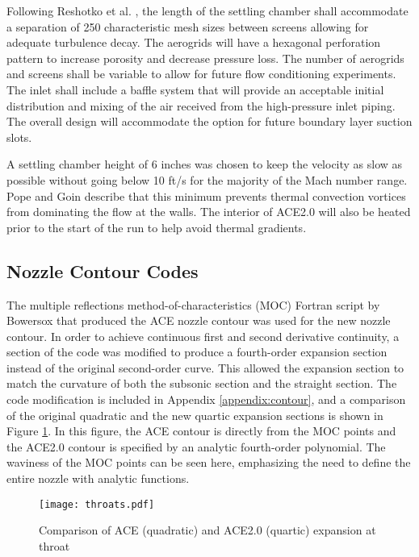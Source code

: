 Following Reshotko et al. \cite{reshotko}, the length of the settling chamber shall accommodate a separation of 250 characteristic mesh sizes between screens allowing for adequate turbulence decay. The aerogrids will have a hexagonal perforation pattern to increase porosity and decrease pressure loss. The number of aerogrids and screens shall be variable to allow for future flow conditioning experiments. The inlet shall include a baffle system that will provide an acceptable initial distribution and mixing of the air received from the high-pressure inlet piping. The overall design will accommodate the option for future boundary layer suction slots.

A settling chamber height of 6 inches was chosen to keep the velocity as slow as possible without going below 10 ft/s for the majority of the Mach number range. Pope and Goin \cite{pope} describe that this minimum prevents thermal convection vortices from dominating the flow at the walls. The interior of ACE2.0 will also be heated prior to the start of the run to help avoid thermal gradients. 

\subsection{Nozzle Contour Codes}

The multiple reflections method-of-characteristics (MOC) Fortran script by Bowersox that produced the ACE nozzle contour was used for the new nozzle contour. In order to achieve continuous first and second derivative continuity, a section of the code was modified to produce a fourth-order expansion section instead of the original second-order curve. This allowed the expansion section to match the curvature of both the subsonic section and the straight section. The code modification is included in Appendix \ref{appendix:contour}, and a comparison of the original quadratic and the new quartic expansion sections is shown in Figure \ref{fig:throats}. In this figure, the ACE contour is directly from the MOC points and the ACE2.0 contour is specified by an analytic fourth-order polynomial. The waviness of the MOC points can be seen here, emphasizing the need to define the entire nozzle with analytic functions.

\begin{figure}[ht!]
    \centering
    \texttt{[image: throats.pdf]}
    \caption{Comparison of ACE (quadratic) and ACE2.0 (quartic) expansion at throat}
    \label{fig:throats}
\end{figure}

